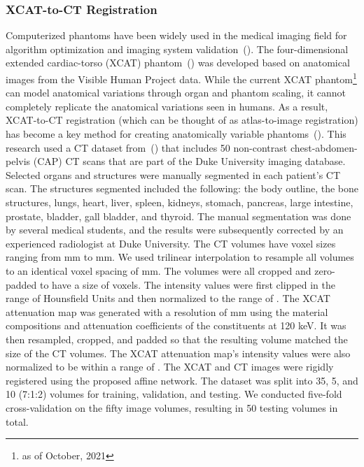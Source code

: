\documentclass[times,twocolumn,final]{elsarticle}
\begin{document}
\subsubsection{XCAT-to-CT Registration}
Computerized phantoms have been widely used in the medical imaging field for algorithm optimization and imaging system validation~(\cite{Christoffersen2013, chen2019incorporating, zhang2017new}). The four-dimensional extended cardiac-torso (XCAT) phantom~(\cite{segars20104d}) was developed based on anatomical images from the Visible Human Project data. While the current XCAT phantom\footnote{as of October, 2021} can model anatomical variations through organ and phantom scaling, it cannot completely replicate the anatomical variations seen in humans. As a result, XCAT-to-CT registration (which can be thought of as atlas-to-image registration) has become a key method for creating anatomically variable phantoms~(\cite{chen2020generating, fu2021iphantom, segars2013population}). This research used a CT dataset from~(\cite{segars2013population}) that includes 50 non-contrast chest-abdomen-pelvis (CAP) CT scans that are part of the Duke University imaging database. Selected organs and structures were manually segmented in each patient's CT scan. The structures segmented included the following: the body outline, the bone structures, lungs, heart, liver, spleen, kidneys, stomach, pancreas, large intestine, prostate, bladder, gall bladder, and thyroid. The manual segmentation was done by several medical students, and the results were subsequently corrected by an experienced radiologist at Duke University. The CT volumes have voxel sizes ranging from mm to mm. We used trilinear interpolation to resample all volumes to an identical voxel spacing of mm. The volumes were all cropped and zero-padded to have a size of  voxels. The intensity values were first clipped in the range of  Hounsfield Units and then normalized to the range of . The XCAT attenuation map was generated with a resolution of mm using the material compositions and attenuation coefficients of the constituents at 120 keV. It was then resampled, cropped, and padded so that the resulting volume matched the size of the CT volumes. The XCAT attenuation map's intensity values were also normalized to be within a range of . The XCAT and CT images were rigidly registered using the proposed affine network. The dataset was split into 35, 5, and 10 (7:1:2) volumes for training, validation, and testing. We conducted five-fold cross-validation on the fifty image volumes, resulting in 50 testing volumes in total.
\end{document}

